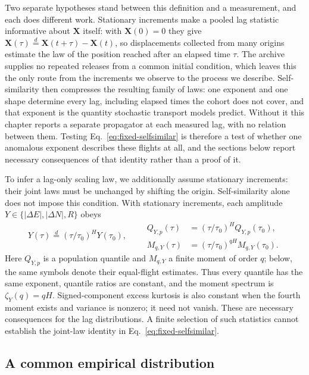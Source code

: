 Two separate hypotheses stand between this definition and a measurement, and each
does different work. Stationary increments make a pooled lag statistic informative
about $\boldsymbol X$ itself: with $\boldsymbol X(0)=0$ they give
$\boldsymbol X(\tau)\overset d=\boldsymbol X(t+\tau)-\boldsymbol X(t)$, so
displacements collected from many origins estimate the law of the position reached
after an elapsed time $\tau$. The archive supplies no repeated releases from a common
initial condition, which leaves this the only route from the increments we observe
to the process we describe. Self-similarity then compresses the resulting family of
laws: one exponent and one shape determine every lag, including elapsed times the
cohort does not cover, and that exponent is the quantity stochastic transport
models predict. Without it this chapter reports a separate
propagator at each measured lag, with no relation between them. Testing
Eq.~\eqref{eq:fixed-selfsimilar} is therefore a test of whether one anomalous
exponent describes these flights at all, and the sections below report necessary
consequences of that identity rather than a proof of it.

To infer a lag-only scaling law, we additionally assume stationary increments:
their joint laws must be unchanged by shifting the origin.
Self-similarity alone does not impose this condition. With stationary increments,
each amplitude $Y\in\{|\Delta E|,|\Delta N|,R\}$ obeys
\begin{equation}
 Y(\tau)\overset d=(\tau/\tau_0)^H Y(\tau_0),\qquad
 \begin{aligned}
 Q_{Y,p}(\tau)&=(\tau/\tau_0)^H Q_{Y,p}(\tau_0),\\
 M_{q,Y}(\tau)&=(\tau/\tau_0)^{qH}M_{q,Y}(\tau_0).
 \end{aligned}
 \label{eq:fixed-scale-family}
\end{equation}
Here $Q_{Y,p}$ is a population quantile and $M_{q,Y}$ a finite moment of order $q$;
below, the same symbols denote their equal-flight estimates.
Thus every quantile has the same exponent, quantile ratios are constant, and the
moment spectrum is $\zeta_Y(q)=qH$. Signed-component excess kurtosis is also constant
when the fourth moment exists and variance is nonzero; it need not vanish. These are
necessary consequences for the lag distributions. A finite selection of such
statistics cannot establish the joint-law identity in Eq.~\eqref{eq:fixed-selfsimilar}.

\subsection{A common empirical distribution}

